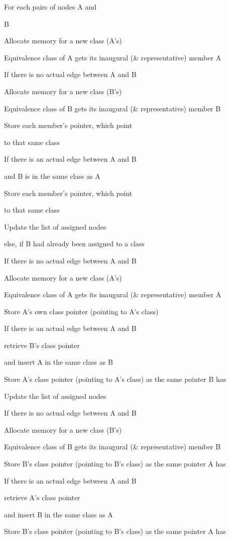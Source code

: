 For each pairs of nodes A and

B

Allocate memory for a new class (A's)

Equivalence class of A gets its inaugural (\& representative) member A

If there is no actual edge between A and B

Allocate memory for a new class (B's)

Equivalence class of B gets its inaugural (\& representative) member B

Store each member's pointer, which point 

to that same class

If there is an actual edge between A and B

and B is in the same class as A

Store each member's pointer, which point 

to that same class

Update the list of assigned nodes

else, if B had already been assigned to a class

If there is no actual edge between A and B

Allocate memory for a new class (A's)

Equivalence class of A gets its inaugural (\& representative) member A

Store A's own class pointer (pointing to A's class) 

If there is an actual edge between A and B

retrieve B's class pointer

and insert A in the same class as B 

Store A's class pointer (pointing to A's class) as the same pointer B has

Update the list of assigned nodes

If there is no actual edge between A and B

Allocate memory for a new class (B's)

Equivalence class of B gets its inaugural (\& representative) member B

Store B's class pointer (pointing to B's class) as the same pointer A has

If there is an actual edge between A and B

retrieve A's class pointer

and insert B in the same class as A 

Store B's class pointer (pointing to B's class) as the same pointer A has

